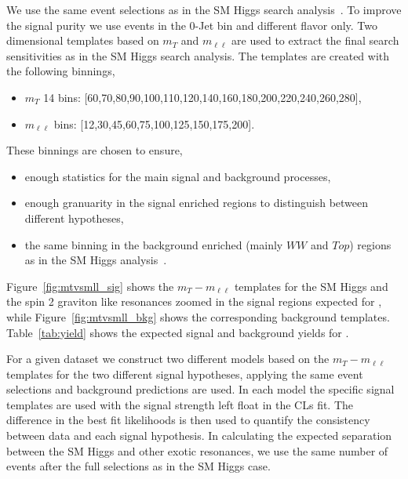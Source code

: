 We use the same event selections as in the SM Higgs search 
analysis~\cite{HWWHCP2012}. To improve the signal purity 
we use events in the 0-Jet bin and different flavor only. 
Two dimensional templates based on $m_T$ and $m_{\ell\ell}$ 
are used to extract the final search sensitivities as in the 
SM Higgs search analysis.
The templates are created with the following binnings,
\begin{itemize}
\item $m_T$ 14 bins: [60,70,80,90,100,110,120,140,160,180,200,220,240,260,280],
\item $m_{\ell\ell}$ bins: [12,30,45,60,75,100,125,150,175,200].
\end{itemize}
These binnings are chosen to ensure, 
\begin{itemize}
\item enough statistics for the main signal and background processes, 
\item enough granuarity in the signal enriched regions to distinguish between 
different hypotheses, 
\item the same binning in the background enriched (mainly $WW$ and $Top$) regions 
as in the SM Higgs analysis~\cite{HWWHCP2012}. 
\end{itemize}
Figure~\ref{fig:mtvsmll_sig} shows the $m_T-m_{\ell\ell}$ templates for the SM Higgs 
and the spin 2 graviton like resonances zoomed in the signal regions expected for \intlumiEightTeV, while 
Figure~\ref{fig:mtvsmll_bkg} shows the corresponding background templates. 
Table~\ref{tab:yield} shows the expected signal and background yields 
for \intlumiEightTeV. 

For a given dataset we construct two different models based on the $m_T-m_{\ell\ell}$ 
templates for the two different signal hypotheses, applying the 
same event selections and background predictions are used.  
In each model the specific signal templates are used with the 
signal strength left float in the CLs fit. 
The difference in the best fit likelihoods is then used 
to quantify the consistency between data and each signal hypothesis. 
In calculating the expected separation between the SM Higgs and other 
exotic resonances, we use the same number of events after the full selections as in 
the SM Higgs case. 

